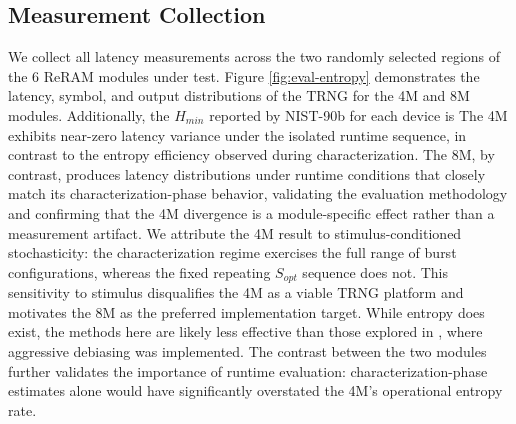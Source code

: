 \subsection {Measurement Collection}
We collect all latency measurements across the two randomly selected
regions of the 6 ReRAM modules under test. Figure \ref{fig:eval-entropy}
demonstrates the latency, symbol, and output distributions of the TRNG
for the 4M and 8M modules. Additionally, the $H_{min}$ reported by
NIST-90b for each device is The 4M exhibits near-zero latency variance
under the isolated runtime sequence, in contrast to the entropy
efficiency observed during characterization. The 8M, by contrast,
produces latency distributions under runtime conditions that closely
match its characterization-phase behavior, validating the evaluation
methodology and confirming that the 4M divergence is a module-specific
effect rather than a measurement artifact. We attribute the 4M result to
stimulus-conditioned stochasticity: the characterization regime
exercises the full range of burst configurations, whereas the fixed
repeating $S_{opt}$ sequence does not. This sensitivity to stimulus
disqualifies the 4M as a viable TRNG platform and motivates the 8M as
the preferred implementation target. While entropy does exist, the
methods here are likely less effective than those explored in
\cite{tolga2024trng}, where aggressive debiasing was implemented. The
contrast between the two modules further validates the importance of
runtime evaluation: characterization-phase estimates alone would have
significantly overstated the 4M's operational entropy rate.